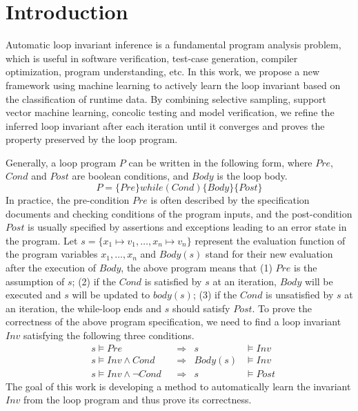 
\section{Introduction} %
\label{sec:introduction}

Automatic loop invariant inference is a fundamental program analysis problem, 
which is useful in software verification, test-case generation, 
compiler optimization, program understanding, etc. 
In this work, we propose a new framework using machine learning 
to actively learn the loop invariant based on the classification of runtime data. 
By combining selective sampling, support vector machine learning, 
concolic testing and model verification, 
we refine the inferred loop invariant after each iteration 
until it converges and proves the property preserved by the loop program. 

Generally, a loop program $P$ can be written in the following form, 
where $\mathit{Pre}$, $\mathit{Cond}$ and $\mathit{Post}$ are boolean conditions, 
and $\mathit{Body}$ is the loop body. 
\[
    P = \{ \mathit{Pre} \} \mathit{while}(\mathit{Cond}) \{ \mathit{Body} \} \{ \mathit{Post} \}
\]
In practice, the pre-condition $\mathit{Pre}$ is often described by 
the specification documents and checking conditions of the program inputs, 
and the post-condition $\mathit{Post}$ is usually specified 
by assertions and exceptions leading to an error state in the program. 
Let $s = \{ x_1 \mapsto v_1, \ldots, x_n \mapsto v_n \}$ represent 
the evaluation function of the program variables $x_1, \ldots, x_n$
and $\mathit{Body}(s)$ stand for their new evaluation after the execution of $\mathit{Body}$, 
the above program means that (1) $\mathit{Pre}$ is the assumption of $s$; 
(2) if the $\mathit{Cond}$ is satisfied by $s$ at an iteration, 
$\mathit{Body}$ will be executed and $s$ will be updated to $\mathit{body}(s)$; 
(3) if the $\mathit{Cond}$ is unsatisfied by $s$ at an iteration, 
the while-loop ends and $s$ should satisfy $\mathit{Post}$. 
To prove the correctness of the above program specification, 
we need to find a loop invariant $\mathit{Inv}$ satisfying the following three conditions. 
\begin{align}
    &s \models \mathit{Pre} 
        &&\Rightarrow & s &\models \mathit{Inv} \label{inv:pre} \\
    &s \models \mathit{Inv} \land \mathit{Cond} 
        &&\Rightarrow & \mathit{Body}(s) &\models \mathit{Inv} \label{inv:loop} \\
    &s \models \mathit{Inv} \land \neg\mathit{Cond} 
        &&\Rightarrow & s &\models \mathit{Post} \label{inv:post}
\end{align}
The goal of this work is developing a method to automatically learn 
the invariant $\mathit{Inv}$ from the loop program and thus prove its correctness. 

